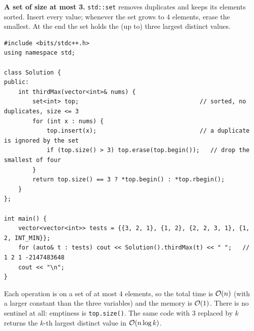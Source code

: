 \begin{alternativebox}
\textbf{A set of size at most 3.} \texttt{std::set} removes duplicates and keeps its elements sorted. Insert every value; whenever the set grows to 4 elements, erase the smallest. At the end the set holds the (up to) three largest distinct values.
\begin{lstlisting}[style=cpp]
#include <bits/stdc++.h>
using namespace std;

class Solution {
public:
    int thirdMax(vector<int>& nums) {
        set<int> top;                                  // sorted, no duplicates, size <= 3
        for (int x : nums) {
            top.insert(x);                             // a duplicate is ignored by the set
            if (top.size() > 3) top.erase(top.begin());   // drop the smallest of four
        }
        return top.size() == 3 ? *top.begin() : *top.rbegin();
    }
};

int main() {
    vector<vector<int>> tests = {{3, 2, 1}, {1, 2}, {2, 2, 3, 1}, {1, 2, INT_MIN}};
    for (auto& t : tests) cout << Solution().thirdMax(t) << " ";   // 1 2 1 -2147483648
    cout << "\n";
}
\end{lstlisting}
Each operation is on a set of at most 4 elements, so the total time is $\mathcal{O}(n)$ (with a larger constant than the three variables) and the memory is $\mathcal{O}(1)$. There is no sentinel at all: emptiness is \texttt{top.size()}. The same code with $3$ replaced by $k$ returns the $k$-th largest distinct value in $\mathcal{O}(n \log k)$.

\begin{diagrambox}
\end{diagrambox}
\end{alternativebox}

